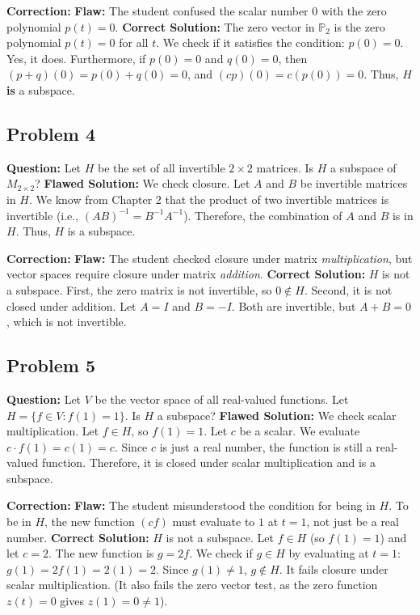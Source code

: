 \documentclass[12pt]{article}
\begin{document}
\textbf{Correction:}
\textbf{Flaw:} The student confused the scalar number $0$ with the zero polynomial $p(t) = 0$.
\textbf{Correct Solution:} The zero vector in $\mathbb{P}_2$ is the zero polynomial $p(t) = 0$ for all $t$. We check if it satisfies the condition: $p(0) = 0$. Yes, it does. Furthermore, if $p(0)=0$ and $q(0)=0$, then $(p+q)(0) = p(0)+q(0) = 0$, and $(cp)(0) = c(p(0)) = 0$. Thus, $H$ \textbf{is} a subspace.

\subsection{Problem 4}
\textbf{Question:} Let $H$ be the set of all invertible $2 \times 2$ matrices. Is $H$ a subspace of $M_{2 \times 2}$?
\textbf{Flawed Solution:}
We check closure. Let $A$ and $B$ be invertible matrices in $H$. We know from Chapter 2 that the product of two invertible matrices is invertible (i.e., $(AB)^{-1} = B^{-1}A^{-1}$). Therefore, the combination of $A$ and $B$ is in $H$. Thus, $H$ is a subspace.

\textbf{Correction:}
\textbf{Flaw:} The student checked closure under matrix \textit{multiplication}, but vector spaces require closure under matrix \textit{addition}.
\textbf{Correct Solution:} $H$ is not a subspace. First, the zero matrix is not invertible, so $0 \notin H$. Second, it is not closed under addition. Let $A = I$ and $B = -I$. Both are invertible, but $A+B = 0$, which is not invertible.

\subsection{Problem 5}
\textbf{Question:} Let $V$ be the vector space of all real-valued functions. Let $H = \{ f \in V : f(1) = 1 \}$. Is $H$ a subspace?
\textbf{Flawed Solution:}
We check scalar multiplication. Let $f \in H$, so $f(1) = 1$. Let $c$ be a scalar.
We evaluate $c \cdot f(1) = c(1) = c$.
Since $c$ is just a real number, the function is still a real-valued function. Therefore, it is closed under scalar multiplication and is a subspace.

\textbf{Correction:}
\textbf{Flaw:} The student misunderstood the condition for being in $H$. To be in $H$, the new function $(cf)$ must evaluate to $1$ at $t=1$, not just be a real number.
\textbf{Correct Solution:} $H$ is not a subspace. Let $f \in H$ (so $f(1)=1$) and let $c=2$. The new function is $g = 2f$. We check if $g \in H$ by evaluating at $t=1$: $g(1) = 2f(1) = 2(1) = 2$. Since $g(1) \neq 1$, $g \notin H$. It fails closure under scalar multiplication. (It also fails the zero vector test, as the zero function $z(t)=0$ gives $z(1)=0 \neq 1$).
\end{document}

